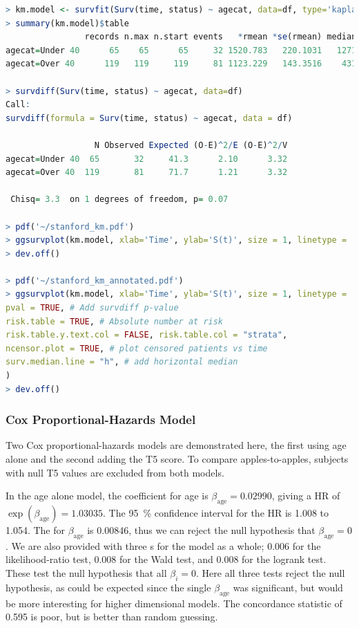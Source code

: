 \begin{lstlisting}[language=R]
> km.model <- survfit(Surv(time, status) ~ agecat, data=df, type='kaplan-meier')
> summary(km.model)$table
                records n.max n.start events   *rmean *se(rmean) median 0.95LCL 0.95UCL
agecat=Under 40      65    65      65     32 1520.783   220.1031   1271     731      NA
agecat=Over 40      119   119     119     81 1123.229   143.3516    431     202     897

> survdiff(Surv(time, status) ~ agecat, data=df)
Call:
survdiff(formula = Surv(time, status) ~ agecat, data = df)

                  N Observed Expected (O-E)^2/E (O-E)^2/V
agecat=Under 40  65       32     41.3      2.10      3.32
agecat=Over 40  119       81     71.7      1.21      3.32

 Chisq= 3.3  on 1 degrees of freedom, p= 0.07

> pdf('~/stanford_km.pdf')
> ggsurvplot(km.model, xlab='Time', ylab='S(t)', size = 1, linetype = 'strata', palette=c('#4e79a7', '#f28e2b'), conf.int = TRUE, legend = c(0.85, 0.85), legend.y = 1, legend.title = '', legend.labs = c('Under 40', 'Over 40'))
> dev.off()

> pdf('~/stanford_km_annotated.pdf')
> ggsurvplot(km.model, xlab='Time', ylab='S(t)', size = 1, linetype = 'strata', palette=c('#4e79a7', '#f28e2b'), conf.int = TRUE, legend = c(0.85, 0.85), legend.y = 1, legend.title = '', legend.labs = c('Under 40', 'Over 40'),
pval = TRUE, # Add survdiff p-value
risk.table = TRUE, # Absolute number at risk
risk.table.y.text.col = FALSE, risk.table.col = "strata",
ncensor.plot = TRUE, # plot censored patients vs time
surv.median.line = "h", # add horizontal median
)
> dev.off()
\end{lstlisting}

\subsubsection{Cox Proportional-Hazards Model}
\label{additional:Survival:Rcode:cox}

Two Cox proportional-hazards models are demonstrated here,
the first using age alone and the second adding the T5 score.
To compare apples-to-apples, subjects with null T5 values are excluded from both models.

In the age alone model, the coefficient for age is
$\beta_{\text{age}} = \num{0.02990}$, giving a HR of
$\exp\left(\beta_{\text{age}}\right) = \num{1.03035}$.
The \SI{95}{\percent} confidence interval for the HR is {1.008} to \num{1.054}.
The \pvalue for $\beta_{\text{age}}$ is \num{0.00846},
thus we can reject the null hypothesis that $\beta_{\text{age}} = 0$.
We are also provided with three {\pvalue}s for the model as a whole;
\num{0.006} for the likelihood-ratio test,
\num{0.008} for the Wald test,
and \num{0.008} for the logrank test.
These test the null hypothesis that all $\beta_{i} = 0$.
Here all three tests reject the null hypothesis,
as could be expected since the single $\beta_{\text{age}}$ was significant,
but would be more interesting for higher dimensional models.
The concordance statistic of \num{0.595} is poor, but is better than random guessing.

